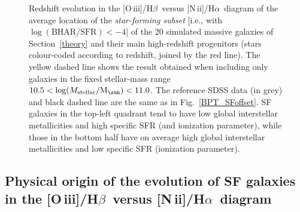 \documentclass[fleqn,usenatbib]{mnras}
\newcommand{\Msun}{\hbox{M$_\sun$}}
\newcommand{\oiiihb}{\hbox{[O\,{\sc iii}]/H$\beta$}}
\newcommand{\niiha}{\hbox{[N\,{\sc ii}]/H$\alpha$}}
\begin{document}
\begin{figure}
\caption{Redshift evolution in the \oiiihb\ versus \niiha\ diagram of
  the average location  of the {\it star-forming subset} [i.e., with
  $\log(\mathrm{BHAR/SFR})< -4$] of the 20  simulated massive galaxies
  of Section~\ref{theory} and their main high-redshift progenitors
  (stars colour-coded according to redshift, joined by the red
  line). The yellow dashed line shows the result obtained when
  including only galaxies in the   fixed stellar-mass range $10.5<\log
  (M_{\rm stellar}/\Msun)<11.0$. The reference SDSS   data (in grey)
  and black dashed line are the same as in Fig.~\ref{BPT_SFoffset}. SF
  galaxies in the top-left quadrant tend to have low global
  interstellar metallicities and high specific SFR (and ionization
  parameter), while those in the bottom half have on average high
  global interstellar metallicities and low specific SFR (ionization
  parameter).}\label{BPT_SF}         
\end{figure}

\subsection{Physical origin of the evolution of SF galaxies in the \oiiihb\ versus \niiha\ diagram} 
\end{document}
